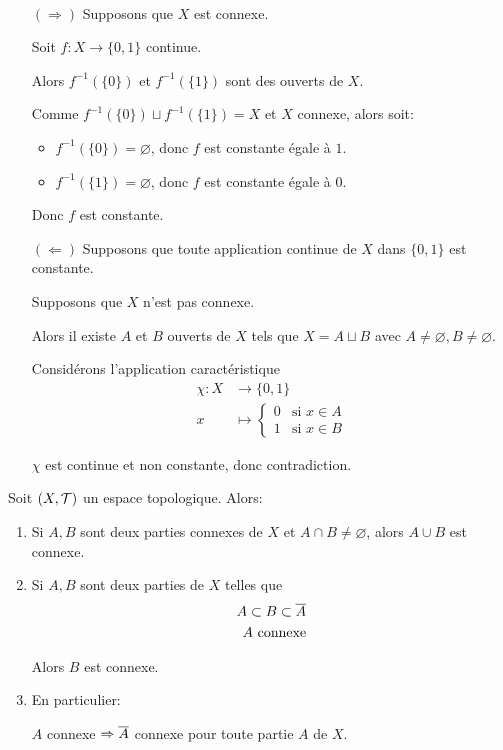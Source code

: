 \documentclass[french,a4paper,10pt]{article}
\begin{document}
	\begin{myproof}\,
		\begin{itemize}
			\item[$(\Rightarrow)$] Supposons que $X$ est connexe.

			Soit $f\colon X\to\{0,1\}$ continue.

			Alors $f^{-1}(\{0\})$ et $f^{-1}(\{1\})$ sont des ouverts de $X$.

			Comme $f^{-1}(\{0\})\sqcup f^{-1}(\{1\})=X$ et $X$ connexe, alors soit:
			\begin{itemize}
				\item $f^{-1}(\{0\})=\varnothing$, donc $f$ est constante égale à $1$.
				\item $f^{-1}(\{1\})=\varnothing$, donc $f$ est constante égale à $0$.
			\end{itemize}

			Donc $f$ est constante.

			\item[$(\Leftarrow)$] Supposons que toute application continue de $X$ dans $\{0,1\}$ est constante.

			Supposons que $X$ n'est pas connexe.

			Alors il existe $A$ et $B$ ouverts de $X$ tels que $X=A\sqcup B$ avec $A\ne\varnothing, B\ne\varnothing$.

			Considérons l'application caractéristique
			\[\begin{aligned}
				\chi\colon X &\to \{0,1\}\\
				x &\mapsto \begin{cases}
					0 & \text{si } x\in A\\
					1 & \text{si } x\in B
				\end{cases}
			\end{aligned}\]
			
			$\chi$ est continue et non constante, donc contradiction.
		\end{itemize}
	\end{myproof}

	\begin{proposition}
		Soit $(X,\cal T)$ un espace topologique. Alors:
		\begin{enumerate}[label= (\arabic*)]
			\item Si $A,B$ sont deux parties connexes de $X$ et $A\cap B\ne\varnothing$, alors $A\cup B$ est connexe.
			\item Si $A,B$ sont deux parties de $X$ telles que
			\[\begin{aligned}
				A\subset B\subset \overline{A}\\
				A\text{ connexe}
			\end{aligned}\]

			Alors $B$ est connexe.

			\item En particulier:

			$A$ connexe $\Rightarrow \overline{A}$ connexe pour toute partie $A$ de $X$.
		\end{enumerate}

	\end{proposition}
\end{document}
